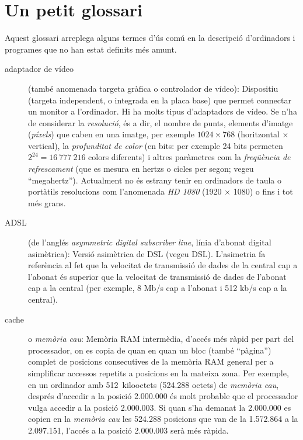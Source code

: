 \section{Un petit glossari}
\label{ss:OiPgloss}


Aquest glossari arreplega alguns termes d'ús comú en la descripció
d'or\-di\-na\-dors i programes que no han estat definits més
amunt.


\begin{description}



\item[adaptador de vídeo] (també anomenada targeta gràfica o
  controlador de vídeo): Dispositiu (targeta independent, o integrada
  en la placa base) que permet connectar un monitor a l'ordinador. Hi
  ha molts tipus d'adaptadors de vídeo. Se n'ha de considerar la
  \emph{resolució}, és a dir, el nombre de punts, elements
  d'imatge (\emph{píxels}) que caben en una imatge, per exemple $1024
  \times 768$ (horitzontal $\times$ vertical), la \emph{profunditat de
    color} (en bits: per exemple 24 bits permeten $2^{24}=16~777~216$
  colors diferents) i altres paràmetres com la {\em freqüència de
    refrescament} (que es mesura en hertzs o cicles per segon; vegeu
  ``megahertz''). Actualment no és estrany tenir en ordinadors de
  taula o portàtils resolucions com l'anomenada \emph{HD 1080} (1920
  $\times$ 1080) o fins i tot més grans.
  
\item[ADSL] (de l'anglés \emph{asymmetric digital subscriber line},
  línia d'abonat digital asimètrica): Versió asimètrica de DSL (vegeu
  DSL). L'asimetria fa referència al fet que la velocitat de
  transmissió de dades de la central cap a l'abonat és superior que la
  velocitat de transmissió de dades de l'abonat cap a la central (per
  exemple, 8 Mb/s cap a l'abonat i 512 kb/s cap a la central).

\item[cache] o \emph{memòria cau}: Memòria RAM intermèdia, d'accés més
ràpid per part del processador, on es copia de quan en quan un bloc
(també ``pàgina'') complet de posicions consecutives de la
memòria RAM general per a simplificar accessos repetits a posicions
en la mateixa zona. Per exemple, en un ordinador amb 512~kilooctets
(524.288 octets) de \emph{memòria cau}, després
d'accedir a la posició 2.000.000 és molt probable que el
processador vulga accedir a la posició 2.000.003. Si quan s'ha
demanat la 2.000.000 es copien en la \emph{memòria cau} les 524.288 posicions
que van de la 1.572.864 a la 2.097.151, l'accés a la posició
2.000.003 serà més ràpida.


\end{description}
